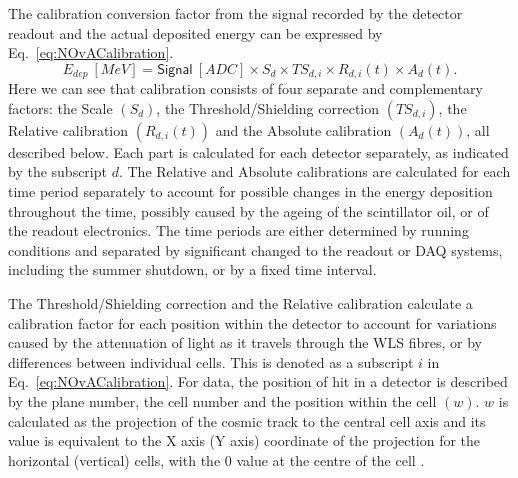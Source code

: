 

The calibration conversion factor from the signal recorded by the detector readout and the actual deposited energy can be expressed by Eq.~\ref{eq:NOvACalibration}.
\begin{equation}\label{eq:NOvACalibration}
E_{dep}\ \left[\unit{MeV}\right]=\textsf{Signal}\ \left[\unit{ADC}\right]\times S_d\times TS_{d,i}\times R_{d,i}\left(t\right)\times A_d\left(t\right).
\end{equation}
Here we can see that calibration consists of four separate and complementary factors: the Scale $\left(S_d\right)$, the Threshold/Shielding correction $\left(TS_{d,i}\right)$, the Relative calibration $\left(R_{d,i}\left(t\right)\right)$ and the Absolute calibration $\left(A_d\left(t\right)\right)$, all described below. Each part is calculated for each detector separately, as indicated by the subscript $d$. The Relative and Absolute calibrations are calculated for each time period separately to account for possible changes in the energy deposition throughout the time, possibly caused by the ageing of the scintillator oil, or of the readout electronics. The time periods are either determined by running conditions and separated by significant changed to the readout or \gls{DAQ} systems, including the summer shutdown, or by a fixed time interval.

The Threshold/Shielding correction and the Relative calibration calculate a calibration factor for each position within the detector to account for variations caused by the attenuation of light as it travels through the \gls{WLS} fibres, or by differences between individual cells. This is denoted as a subscript $i$ in Eq.~\ref{eq:NOvACalibration}. For data, the position of hit in a detector is described by the plane number, the cell number and the position within the cell $\left(w\right)$. $w$ is calculated as the projection of the cosmic track to the central cell axis and its value is equivalent to the X axis (Y axis) coordinate of the projection for the horizontal (vertical) cells, with the 0 value at the centre of the cell \cite{PrabhjotNOvAThesis_CalibrationAndOscResults2019.pdf}.

